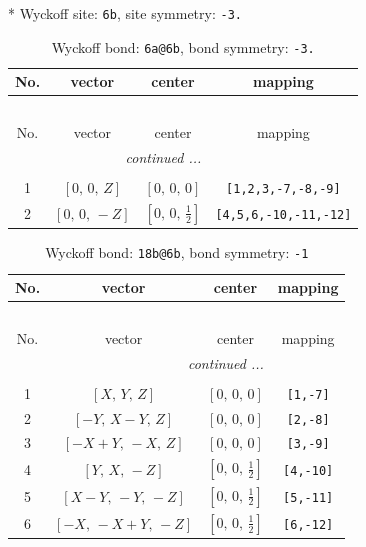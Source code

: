\documentclass[fleqn,8pt]{jsarticle}
\begin{document}
* Wyckoff site: {\tt 6b}, site symmetry: {\tt -3.}
\renewcommand{\arraystretch}{1.2}
\begin{longtable}{cccc}
\caption{Wyckoff bond: {\tt 6a@6b}, bond symmetry: {\tt -3.}}
 \\
 \hline \hline
No. & vector & center & mapping \\ \hline \endfirsthead

\multicolumn{3}{l}{\tablename\ \thetable{}} \\
 \hline \hline
No. & vector & center & mapping \\ \hline \endhead

 \hline \hline
\multicolumn{3}{r}{\footnotesize\it continued ...} \\ \endfoot

 \hline \hline
\multicolumn{3}{r}{} \\ \endlastfoot

1 & $\left[ 0,\, 0,\, Z \right]$ & $\left[ 0,\, 0,\, 0 \right]$ & {\tt [1,2,3,-7,-8,-9]} \\ \hline
2 & $\left[ 0,\, 0,\, - Z \right]$ & $\left[ 0,\, 0,\, \frac{1}{2} \right]$ & {\tt [4,5,6,-10,-11,-12]} \\
\end{longtable}
\renewcommand{\arraystretch}{1.2}
\begin{longtable}{cccc}
\caption{Wyckoff bond: {\tt 18b@6b}, bond symmetry: {\tt -1}}
 \\
 \hline \hline
No. & vector & center & mapping \\ \hline \endfirsthead

\multicolumn{3}{l}{\tablename\ \thetable{}} \\
 \hline \hline
No. & vector & center & mapping \\ \hline \endhead

 \hline \hline
\multicolumn{3}{r}{\footnotesize\it continued ...} \\ \endfoot

 \hline \hline
\multicolumn{3}{r}{} \\ \endlastfoot

1 & $\left[ X,\, Y,\, Z \right]$ & $\left[ 0,\, 0,\, 0 \right]$ & {\tt [1,-7]} \\ \hline
2 & $\left[ - Y,\, X - Y,\, Z \right]$ & $\left[ 0,\, 0,\, 0 \right]$ & {\tt [2,-8]} \\ \hline
3 & $\left[ - X + Y,\, - X,\, Z \right]$ & $\left[ 0,\, 0,\, 0 \right]$ & {\tt [3,-9]} \\ \hline
4 & $\left[ Y,\, X,\, - Z \right]$ & $\left[ 0,\, 0,\, \frac{1}{2} \right]$ & {\tt [4,-10]} \\ \hline
5 & $\left[ X - Y,\, - Y,\, - Z \right]$ & $\left[ 0,\, 0,\, \frac{1}{2} \right]$ & {\tt [5,-11]} \\ \hline
6 & $\left[ - X,\, - X + Y,\, - Z \right]$ & $\left[ 0,\, 0,\, \frac{1}{2} \right]$ & {\tt [6,-12]} \\
\end{longtable}
\end{document}
